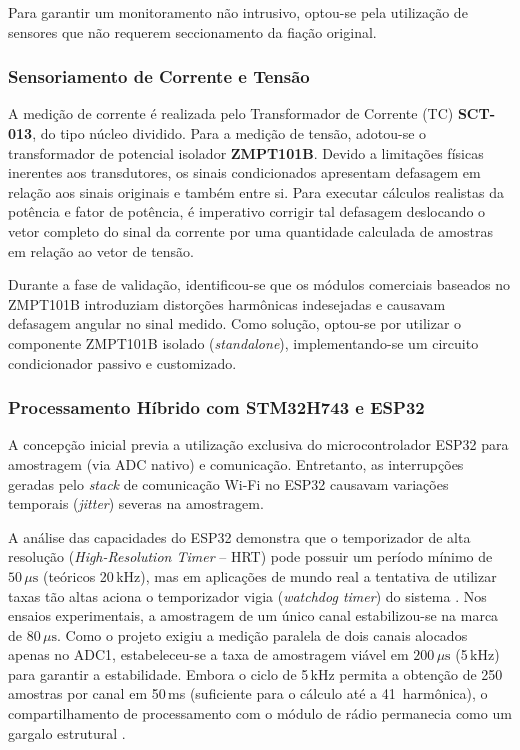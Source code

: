 \documentclass[12pt]{article}
\begin{document}
Para garantir um monitoramento n\~ao intrusivo, optou-se pela utiliza\c{c}\~ao de
sensores que n\~ao requerem seccionamento da fia\c{c}\~ao original.

\subsubsection{Sensoriamento de Corrente e Tens\~ao}

A medi\c{c}\~ao de corrente \'e realizada pelo Transformador de Corrente (TC)
\textbf{SCT-013}, do tipo n\'ucleo dividido. Para a medi\c{c}\~ao de tens\~ao,
adotou-se o transformador de potencial isolador \textbf{ZMPT101B}. Devido a
limita\c{c}\~oes f\'isicas inerentes aos transdutores, os sinais condicionados
apresentam defasagem em rela\c{c}\~ao aos sinais originais e tamb\'em entre si.
Para executar c\'alculos realistas da pot\^encia e fator de pot\^encia, \'e imperativo
corrigir tal defasagem deslocando o vetor completo do sinal da corrente por uma
quantidade calculada de amostras em rela\c{c}\~ao ao vetor de tens\~ao.

Durante a fase de valida\c{c}\~ao, identificou-se que os m\'odulos comerciais
baseados no ZMPT101B introduziam distor\c{c}\~oes harm\^onicas indesejadas e
causavam defasagem angular no sinal medido. Como solu\c{c}\~ao, optou-se por
utilizar o componente ZMPT101B isolado (\textit{standalone}), implementando-se um
circuito condicionador passivo e customizado.

\subsubsection{Processamento H\'ibrido com STM32H743 e ESP32}

A concep\c{c}\~ao inicial previa a utiliza\c{c}\~ao exclusiva do microcontrolador
ESP32 para amostragem (via ADC nativo) e comunica\c{c}\~ao. Entretanto, as
interrup\c{c}\~oes geradas pelo \textit{stack} de comunica\c{c}\~ao Wi-Fi no ESP32
causavam varia\c{c}\~oes temporais (\textit{jitter}) severas na amostragem.

A an\'alise das capacidades do ESP32 demonstra que o temporizador de alta
resolu\c{c}\~ao (\textit{High-Resolution Timer} -- HRT) pode possuir um per\'iodo
m\'inimo de $50\,\mu\text{s}$ (te\'oricos 20\,kHz), mas em aplica\c{c}\~oes de mundo
real a tentativa de utilizar taxas t\~ao altas aciona o temporizador vigia
(\textit{watchdog timer}) do sistema \cite{ref8}. Nos ensaios experimentais, a
amostragem de um \'unico canal estabilizou-se na marca de $80\,\mu\text{s}$. Como o
projeto exigiu a medi\c{c}\~ao paralela de dois canais alocados apenas no ADC1,
estabeleceu-se a taxa de amostragem vi\'avel em $200\,\mu\text{s}$ (5\,kHz) para
garantir a estabilidade. Embora o ciclo de 5\,kHz permita a obten\c{c}\~ao de 250
amostras por canal em 50\,ms (suficiente para o c\'alculo at\'e a 41\textordfeminine~harm\^onica),
o compartilhamento de processamento com o m\'odulo de r\'adio permanecia como um
gargalo estrutural \cite{ref8}.
\end{document}
